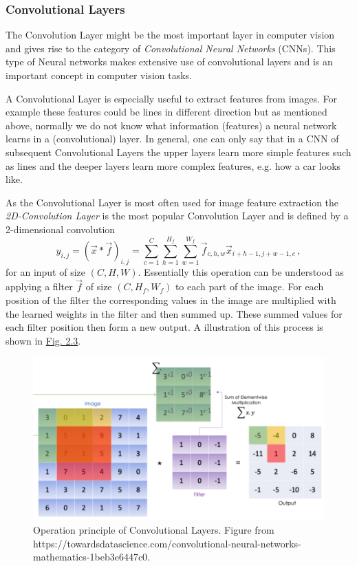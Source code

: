 \subsubsection{Convolutional Layers}
The Convolution Layer might be the most important layer in computer vision and gives rise to the category of \textit{Convolutional Neural Networks} (CNNs). This type of Neural networks makes extensive use of convolutional layers and is an important concept in computer vision tasks.

A Convolutional Layer is especially useful to extract features from images. For example these features could be lines in different direction but as mentioned above, normally we do not know what information (features) a neural network learns in a (convolutional) layer. In general, one can only say that in a CNN of subsequent Convolutional Layers the upper layers learn more simple features such as lines and the deeper layers learn more complex features, e.g. how a car looks like.

As the Convolutional Layer is most often used for image feature extraction the \textit{2D-Convolution Layer} is the most popular Convolution Layer and is defined by a 2-dimensional convolution
%
\begin{equation}
    y_{i,j}=(\vec{x}\ast\vec{f})_{i,j}=\sum_{c=1}^{C}\sum_{h=1}^{H_f}\sum_{w=1}^{W_f}\vec{f}_{c,h,w}\vec{x}_{i+h-1,j+w-1,c}\,,
\end{equation}
%
for an input of size $(C,H,W)$. Essentially this operation can be understood as applying a filter $\vec{f}$ of size $(C, H_f, W_f)$ to each part of the image. For each position of the filter the corresponding values in the image are multiplied with the learned weights in the filter and then summed up. These summed values for each filter position then form a new output. A illustration of this process is shown in \hyperref[fig:2.3]{Fig. 2.3}.
%
\begin{figure} \label{fig:2.3}
    \centering
    \includegraphics[width=.65\textwidth]{Chapters/figures/convolution.PNG}
    \caption[Operation principle of Convolutional Layers]{Operation principle of Convolutional Layers. Figure from\\ https://towardsdatascience.com/convolutional-neural-networks-mathematics-1beb3e6447c0.}
\end{figure}
%

